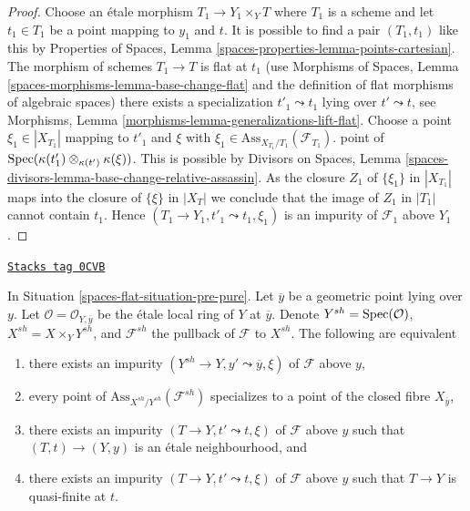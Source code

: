 \begin{proof}
Choose an \'etale morphism $T_1 \to Y_1 \times_Y T$ where $T_1$
is a scheme and let $t_1 \in T_1$ be a point mapping to $y_1$ and $t$.
It is possible to find a pair $(T_1, t_1)$ like this by
Properties of Spaces, Lemma \ref{spaces-properties-lemma-points-cartesian}.
The morphism of schemes $T_1 \to T$ is flat at $t_1$
(use Morphisms of Spaces, Lemma \ref{spaces-morphisms-lemma-base-change-flat}
and the definition of flat morphisms of algebraic spaces)
there exists a specialization $t'_1 \leadsto t_1$ lying over
$t' \leadsto t$, see
Morphisms, Lemma \ref{morphisms-lemma-generalizations-lift-flat}.
Choose a point $\xi_1 \in |X_{T_1}|$ mapping to $t'_1$
and $\xi$ with $\xi_1 \in \text{Ass}_{X_{T_1}/T_1}(\mathcal{F}_{T_1})$.
point of $\operatorname{Spec}(\kappa(t'_1) \otimes_{\kappa(t')} \kappa(\xi))$.
This is possible by
Divisors on Spaces, Lemma
\ref{spaces-divisors-lemma-base-change-relative-assassin}.
As the closure $Z_1$ of $\{\xi_1\}$ in $|X_{T_1}|$ maps into the
closure of $\{\xi\}$ in $|X_T|$ we conclude that
the image of $Z_1$ in $|T_1|$ cannot contain $t_1$.
Hence $(T_1 \to Y_1, t'_1 \leadsto t_1, \xi_1)$
is an impurity of $\mathcal{F}_1$ above $Y_1$.
\end{proof}

\begin{lemma}
\label{spaces-flat-lemma-pure-along-X-y}
\href{https://stacks.math.columbia.edu/tag/0CVB}{\texttt{Stacks tag 0CVB}}

In Situation \ref{spaces-flat-situation-pre-pure}. Let $\overline{y}$ be a geometric
point lying over $y$. Let $\mathcal{O} = \mathcal{O}_{Y, \overline{y}}$
be the \'etale local ring of $Y$ at $\overline{y}$. Denote
$Y^{sh} = \operatorname{Spec}(\mathcal{O})$, $X^{sh} = X \times_Y Y^{sh}$, and
$\mathcal{F}^{sh}$ the pullback of $\mathcal{F}$ to $X^{sh}$.
The following are equivalent
\begin{enumerate}
\item there exists an impurity
$(Y^{sh} \to Y, y' \leadsto \overline{y}, \xi)$
of $\mathcal{F}$ above $y$,
\item every point of $\text{Ass}_{X^{sh}/Y^{sh}}(\mathcal{F}^{sh})$
specializes to a point of the closed fibre $X_{\overline{y}}$,
\item there exists an impurity $(T \to Y, t' \leadsto t, \xi)$
of $\mathcal{F}$ above $y$ such that $(T, t) \to (Y, y)$ is an
\'etale neighbourhood, and
\item there exists an impurity $(T \to Y, t' \leadsto t, \xi)$
of $\mathcal{F}$ above $y$ such that $T \to Y$ is quasi-finite at $t$.
\end{enumerate}
\end{lemma}

